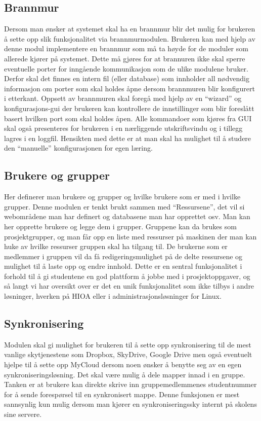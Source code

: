 \subsection{Brannmur}
Dersom man ønsker at systemet skal ha en brannmur blir det mulig for brukeren å sette opp slik funksjonalitet via brannmurmodulen. Brukeren kan med hjelp av denne modul implementere en brannmur som må ta høyde for de moduler som allerede kjører på systemet. Dette må gjøres for at brannuren ikke skal sperre eventuelle porter for inngående kommunikasjon som de ulike modulene bruker. Derfor skal det finnes en intern fil (eller database) som innholder all nødvendig informasjon om porter som skal holdes åpne dersom brannmuren blir konfigurert i etterkant. Oppsett av brannmuren skal foregå med hjelp av en “wizard” og konfigurasjons-gui der brukeren kan kontrollere de innstillinger som blir foreslått basert hvilken port som skal holdes åpen. Alle kommandoer som kjøres fra GUI skal også presenteres for brukeren i en nærliggende utskriftsvindu og i tillegg lagres i en loggfil. Hensikten med dette er at man skal ha mulighet til å studere den “manuelle” konfigurasjonen for egen læring.

\subsection{Brukere og grupper}
Her definerer man brukere og grupper og hvilke brukere som er med i hvilke grupper.
Denne modulen er tenkt brukt sammen med “Ressursene”, det vil si webområdene man har definert og databasene man har opprettet osv. 
Man kan her opprette brukere og legge dem i grupper. Gruppene kan da brukes som prosjektgrupper, og man får opp en liste med ressurser på maskinen der man kan huke av hvilke ressurser gruppen skal ha tilgang til. De brukerne som er medlemmer i gruppen vil da få redigeringsmulighet på de delte ressursene og mulighet til å laste opp og endre innhold.
Dette er en sentral funksjonalitet i forhold til å gi studentene en god plattform å jobbe med i prosjektoppgaver, og så langt vi har oversikt over er det en unik funksjonalitet som ikke tilbys i andre løsninger, hverken på HIOA eller i administrasjonsløsninger for Linux.

\subsection{Synkronisering}
Modulen skal gi mulighet for brukeren til å sette opp synkronisering til de mest vanlige skytjenestene som Dropbox, SkyDrive, Google Drive men også eventuelt hjelpe til å sette opp MyCloud dersom noen ønsker å benytte seg av en egen synkroniseringsløsning. 
Det skal være mulig å dele mapper innad i en gruppe. Tanken er at brukere kan direkte skrive inn gruppemedlemmenes studentnummer for å sende forespørsel til en synkronisert mappe. Denne funksjonen er mest sannsynlig kun mulig dersom man kjører en synkroniseringssky internt på skolens sine servere. 

